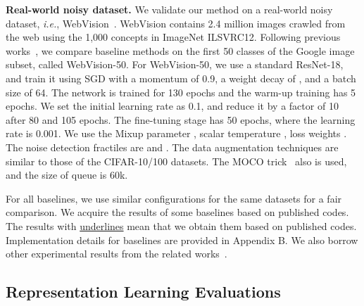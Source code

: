 \documentclass[10pt,twocolumn,letterpaper]{article}
\newcommand{\myPara}[1]{\vspace{.05in}\noindent\textbf{#1}}
\begin{document}
\myPara{Real-world noisy dataset.} We validate our method on a real-world noisy dataset, \textit{i.e.}, WebVision~\cite{abs_1708_02862}. WebVision contains 2.4 million images crawled from the web using the 1,000 concepts in ImageNet ILSVRC12. Following previous works~\cite{LiSH20,Ortego2021}, we compare baseline methods on the first 50 classes of the Google image subset, called WebVision-50. For WebVision-50, we use a standard ResNet-18, and train it using SGD with a momentum of 0.9, a weight decay of , and a batch size of 64. The network is trained for 130 epochs and the warm-up training has 5 epochs. We set the initial learning rate as 0.1, and reduce it by a factor of 10 after 80 and 105 epochs. The fine-tuning stage has 50 epochs, where the learning rate is 0.001. We use the Mixup parameter , scalar temperature , loss weights . The noise detection fractiles are   and . The data augmentation techniques are similar to those of the CIFAR-10/100 datasets. The MOCO trick~\cite{He0WXG20} also is used, and the size of queue is 60k.

For all baselines, we use similar configurations for the same datasets for a fair comparison. We acquire the results of some baselines based on published codes. The results with \underline{underlines} mean that we obtain them based on published codes. Implementation details for baselines are provided in Appendix B. We also borrow other experimental results from the related works~\cite{LiSH20,Zheltonozhskii2021,LiuNRF20, Zhi2021ICCV,Ortego2021icpr,Ortego2021}.

\vspace{-2pt}
\subsection{Representation Learning Evaluations}\label{sec:4.2}
\end{document}

